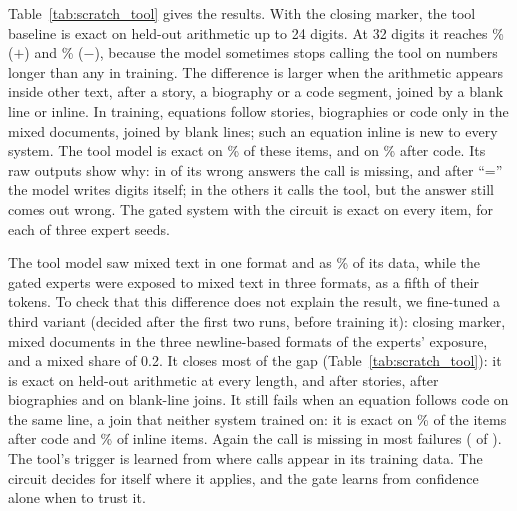 \documentclass[10pt]{article}
\begin{document}
Table~\ref{tab:scratch_tool} gives the results. With the closing marker, the tool baseline
is exact on held-out arithmetic up to 24 digits. At 32 digits it reaches
\resTrackCToolEndPlusThirtyTwo\% ($+$) and \resTrackCToolEndMinusThirtyTwo\% ($-$), because the
model sometimes stops calling the tool on numbers longer than any in training. The difference
is larger when the arithmetic appears inside other text, after a story, a biography or a code
segment, joined by a blank line or inline. In training, equations follow stories, biographies
or code only in the mixed documents, joined by blank lines; such an equation inline is new to
every system. The tool model is exact on \resTrackCToolEndCtxAll\% of these items, and on
\resTrackCToolEndCtxCode\% after code. Its raw outputs show why: in \resTrackCToolEndFailNoCall{}
of its \resTrackCToolEndFailWrong{} wrong answers the call is missing, and after ``='' the model
writes digits itself; in the others it calls the tool, but the answer still comes out wrong. The gated system with the circuit is exact on every
item, for each of three expert seeds.

The tool model saw mixed text in one format and as \resTrackCMonoSMixedPct\% of its data, while
the gated experts were exposed to mixed text in three formats, as a fifth of their tokens. To
check that this difference does not explain the result, we fine-tuned a third variant (decided
after the first two runs, before training it): closing marker, mixed documents in the three
newline-based formats of the experts' exposure, and a mixed share of 0.2. It closes most of the
gap (Table~\ref{tab:scratch_tool}): it is exact on held-out arithmetic at every length, and
after stories, after biographies and on blank-line joins. It still fails when an equation
follows code on the same line, a join that neither system trained on: it is exact on
\resTrackCToolVarCtxCode\% of the items after code and \resTrackCToolVarCtxInline\% of inline
items. Again the call is missing in most failures (\resTrackCToolVarFailNoCall{} of
\resTrackCToolVarFailWrong{}). The
tool's trigger is learned from where calls appear in its training data. The circuit decides for
itself where it applies, and the gate learns from confidence alone when to trust it.
\end{document}

